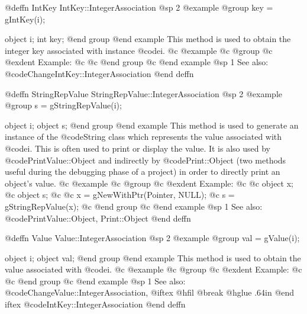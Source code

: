 @deffn {IntKey} IntKey::IntegerAssociation
@sp 2
@example
@group
key = gIntKey(i);

object  i;
int     key;
@end group
@end example
This method is used to obtain the integer key associated with instance @code{i}.
@c @example
@c @group
@c @exdent Example:
@c 
@c @end group
@c @end example
@sp 1
See also:  @code{ChangeIntKey::IntegerAssociation}
@end deffn









@deffn {StringRepValue} StringRepValue::IntegerAssociation
@sp 2
@example
@group
s = gStringRepValue(i);

object  i;
object  s;
@end group
@end example
This method is used to generate an instance of the @code{String} class
which represents the value associated with @code{i}.  This is often
used to print or display the value.  It is also used by
@code{PrintValue::Object} and indirectly by @code{Print::Object}
(two methods useful during the debugging phase of a project)
in order to directly print an object's value.
@c @example
@c @group
@c @exdent Example:
@c 
@c object  x;
@c object  s;
@c 
@c x = gNewWithPtr(Pointer, NULL);
@c s = gStringRepValue(x);
@c @end group
@c @end example
@sp 1
See also:  @code{PrintValue::Object, Print::Object}
@end deffn










@deffn {Value} Value::IntegerAssociation
@sp 2
@example
@group
val = gValue(i);

object  i;
object  val;
@end group
@end example
This method is used to obtain the value associated with
@code{i}.
@c @example
@c @group
@c @exdent Example:
@c 
@c @end group
@c @end example
@sp 1
See also:  @code{ChangeValue::IntegerAssociation,}
@iftex
@hfil @break @hglue .64in      
@end iftex
@code{IntKey::IntegerAssociation}
@end deffn





